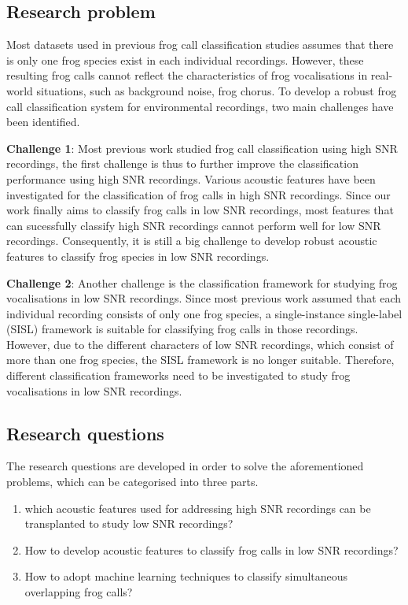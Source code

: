 \subsection{Research problem}
Most datasets used in previous frog call classification studies assumes that there is only one frog species exist in each individual recordings. However, these resulting frog calls cannot reflect the characteristics of frog vocalisations in real-world situations, such as background noise, frog chorus. To develop a robust frog call classification system for environmental recordings, two main challenges have been identified. 


\noindent \textbf{Challenge 1}: Most previous work studied frog call classification using high SNR recordings, the first challenge is thus to further improve the classification performance using high SNR recordings. Various acoustic features have been investigated for the classification of frog calls in high SNR recordings. Since our work finally aims to classify frog calls in low SNR recordings, most features that can sucessfully classify high SNR recordings cannot perform well for low SNR recordings. Consequently, it is still a big challenge to develop robust acoustic features to classify frog species in low SNR recordings. 

\noindent \textbf{Challenge 2}: Another challenge is the classification framework for studying frog vocalisations in low SNR recordings. Since most previous work assumed that each individual recording consists of only one frog species, a single-instance single-label (SISL) framework is suitable for classifying frog calls in those recordings. However, due to the different characters of low SNR recordings, which consist of more than one frog species, the SISL framework is no longer suitable. Therefore, different classification frameworks need to be investigated to study frog vocalisations in low SNR recordings.



\subsection{Research questions}
The research questions are developed in order to solve the aforementioned problems, which can be categorised into three parts. 

 \begin{enumerate}
     \item which acoustic features used for addressing high SNR recordings can be transplanted to study low SNR recordings?
     \item How to develop acoustic features to classify frog calls in low SNR recordings?
     \item How to adopt machine learning techniques to classify simultaneous overlapping frog calls?
  \end{enumerate}




